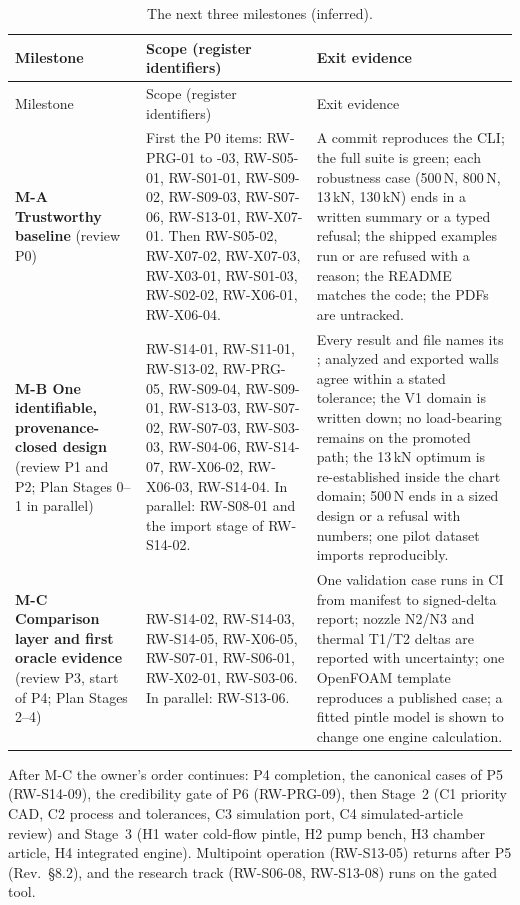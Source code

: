 {\rwsmall
\begin{longtable}{@{}P{2.6cm}P{7.3cm}P{6.2cm}@{}}
\caption{The next three milestones (inferred).}\label{tab:rw-milestones}\\
\toprule
Milestone & Scope (register identifiers) & Exit evidence \\
\midrule
\endfirsthead
\toprule
Milestone & Scope (register identifiers) & Exit evidence \\
\midrule
\endhead
\textbf{M-A Trustworthy baseline} (review P0) & First the P0 items: RW-PRG-01 to -03, RW-S05-01, RW-S01-01, RW-S09-02, RW-S09-03, RW-S07-06, RW-S13-01, RW-X07-01. Then RW-S05-02, RW-X07-02, RW-X07-03, RW-X03-01, RW-S01-03, RW-S02-02, RW-X06-01, RW-X06-04. & A commit reproduces the CLI; the full suite is green; each robustness case (500\,N, 800\,N, 13\,kN, 130\,kN) ends in a written summary or a typed refusal; the shipped examples run or are refused with a reason; the README matches the code; the PDFs are untracked. \\
\textbf{M-B One identifiable, provenance-closed design} (review P1 and P2; Plan Stages 0--1 in parallel) & RW-S14-01, RW-S11-01, RW-S13-02, RW-PRG-05, RW-S09-04, RW-S09-01, RW-S13-03, RW-S07-02, RW-S07-03, RW-S03-03, RW-S04-06, RW-S14-07, RW-X06-02, RW-X06-03, RW-S14-04. In parallel: RW-S08-01 and the import stage of RW-S14-02. & Every result and file names its ; analyzed and exported walls agree within a stated tolerance; the V1 domain is written down; no load-bearing  remains on the promoted path; the 13\,kN optimum is re-established inside the chart domain; 500\,N ends in a sized design or a refusal with numbers; one pilot dataset imports reproducibly. \\
\textbf{M-C Comparison layer and first oracle evidence} (review P3, start of P4; Plan Stages 2--4) & RW-S14-02, RW-S14-03, RW-S14-05, RW-X06-05, RW-S07-01, RW-S06-01, RW-X02-01, RW-S03-06. In parallel: RW-S13-06. & One validation case runs in CI from manifest to signed-delta report; nozzle N2/N3 and thermal T1/T2 deltas are reported with uncertainty; one OpenFOAM template reproduces a published case; a fitted pintle model is shown to change one engine calculation. \\
\bottomrule
\end{longtable}
}

After M-C the owner's order continues: P4 completion, the canonical cases of P5 (RW-S14-09), the credibility gate of P6 (RW-PRG-09), then Stage~2 (C1 priority CAD, C2 process and tolerances, C3 simulation port, C4 simulated-article review) and Stage~3 (H1 water cold-flow pintle, H2 pump bench, H3 chamber article, H4 integrated engine). Multipoint operation (RW-S13-05) returns after P5 (Rev.\ \S8.2), and the research track (RW-S06-08, RW-S13-08) runs on the gated tool.

